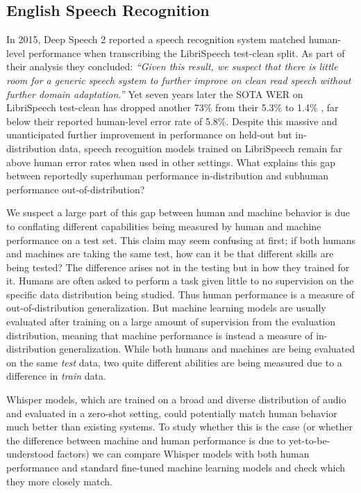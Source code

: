 \subsection{English Speech Recognition}\label{subsec:zero-shot}

In 2015, Deep Speech 2 \cite{amodei2015deepspeech2} reported a speech recognition system matched human-level performance when transcribing the LibriSpeech test-clean split. As part of their analysis they concluded: \textit{``Given this result, we suspect that there is little room for a generic speech system to further improve on clean read speech without further domain adaptation.''} Yet seven years later the SOTA WER on LibriSpeech test-clean has dropped another 73\% from their 5.3\% to 1.4\% \cite{zhang2021bigssl}, far below their reported human-level error rate of 5.8\%. Despite this massive and unanticipated further improvement in performance on held-out but in-distribution data, speech recognition models trained on LibriSpeech remain far above human error rates when used in other settings.
What explains this gap between reportedly superhuman performance in-distribution and subhuman performance out-of-distribution?

We suspect a large part of this gap between human and machine behavior is due to conflating different capabilities being measured by human and machine performance on a test set. This claim may seem confusing at first; if both humans and machines are taking the same test, how can it be that different skills are being tested? The difference arises not in the testing but in how they trained for it. Humans are often asked to perform a task given little to no supervision on the specific data distribution being studied. Thus human performance is a measure of out-of-distribution generalization. But machine learning models are usually evaluated after training on a large amount of supervision from the evaluation distribution, meaning that machine performance is instead a measure of in-distribution generalization. While both humans and machines are being evaluated on the same \textit{test} data, two quite different abilities are being measured due to a difference in \textit{train} data.

Whisper models, which are trained on a broad and diverse distribution of audio and evaluated in a zero-shot setting, could potentially match human behavior much better than existing systems. To study whether this is the case (or whether the difference between machine and human performance is due to yet-to-be-understood factors) we can compare Whisper models with both human performance and standard fine-tuned machine learning models and check which they more closely match.

